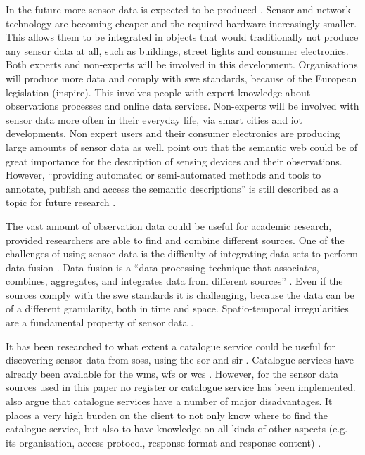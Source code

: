 In the future more sensor data is expected to be produced \citep{IoT:PWC}. Sensor and network technology are becoming cheaper and the required hardware increasingly smaller. This allows them to be integrated in objects that would traditionally not produce any sensor data at all, such as buildings, street lights and consumer electronics. Both experts and non-experts will be involved in this development. Organisations will produce more data and comply with \ac{swe} standards, because of the European legislation (\ac{inspire}). This involves people with expert knowledge about observations processes and online data services. Non-experts will be involved with sensor data more often in their everyday life, via smart cities and \ac{iot} developments. Non expert users and their consumer electronics are producing large amounts of sensor data as well. \cite{IOT:Barnaghi} point out that the semantic web could be of great importance for the description of sensing devices and their observations. However, \enquote{providing automated or semi-automated methods and tools to annotate, publish and access the semantic descriptions} is still described as a topic for future research \cite[p. 19]{IOT:Barnaghi}. 

The vast amount of observation data could be useful for academic research, provided researchers are able to find and combine different sources. One of the challenges of using sensor data is the difficulty of integrating data sets to perform data fusion \citep{SSW:Corcho, SSW:Ji, SSW:Wang}. Data fusion is a \enquote{data processing technique that associates, combines, aggregates, and integrates data from different sources} \cite[p. 2]{SSW:Wang2}. Even if the sources comply with the \ac{swe} standards it is challenging, because the data can be of a different granularity, both in time and space. Spatio-temporal irregularities are a fundamental property of sensor data \citep{SW:Ganesan}. 

It has been researched to what extent a catalogue service could be useful for discovering sensor data from \aclp{sos}, using the \ac{sor} \citep{SW:OGC4} and \ac{sir} \citep{SW:OGC3}. Catalogue services have already been available for the \ac{wms}, \ac{wfs} or \ac{wcs} \citep{SDI:OGC2}. However, for the sensor data sources used in this paper no register or catalogue service has been implemented. \cite{SSW:Atkinson} also argue that catalogue services have a number of major disadvantages. It places a very high burden on the client to not only know where to find the catalogue service, but also to have knowledge on all kinds of other aspects (e.g. its organisation, access protocol, response format and response content) \cite[p. 128]{SSW:Atkinson}. 


